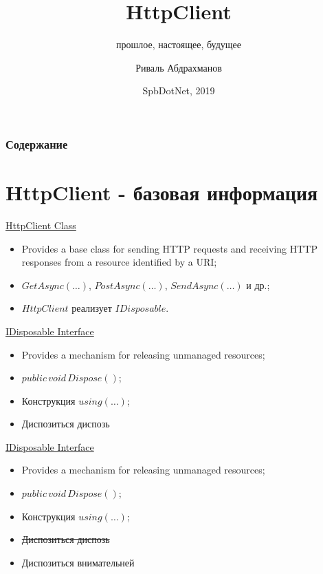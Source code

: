 \documentclass{beamer}
\title{HttpClient}
\subtitle{прошлое, настоящее, будущее}
\author{Риваль Абдрахманов}
\institute[PT]{Positive Technologies}
\date{SpbDotNet, 2019}
\begin{document}
\begin{frame}
\titlepage
\end{frame}

\begin{frame}
\frametitle{Содержание}
\tableofcontents
\end{frame}

\section{HttpClient - базовая информация}

\begin{frame}{\href{https://docs.microsoft.com/en-us/dotnet/api/system.net.http.httpclient?view=netcore-2.2}{HttpClient Class}}
    \begin{itemize}
        \item <1-> Provides a base class for sending HTTP requests and receiving HTTP responses from a resource identified by a URI;
        \item <2-> $GetAsync(\ldots)$, $PostAsync(\ldots)$, $SendAsync(\ldots)$ и др.;
        \item <3-> $HttpClient$ реализует $IDisposable$.
    \end{itemize}
\end{frame}

\begin{frame}{\href{https://docs.microsoft.com/en-us/dotnet/api/system.idisposable?view=netcore-2.2}{IDisposable Interface}}
    \begin{itemize}
        \item <1-> Provides a mechanism for releasing unmanaged resources;
        \item <2-> $public\,void\,Dispose()$;
        \item <3-> Конструкция $using(\ldots)$;
        \item <4-> Диспозиться\,\textrightarrow \,диспозь
    \end{itemize}
\end{frame}

\begin{frame}{\href{https://docs.microsoft.com/en-us/dotnet/api/system.idisposable?view=netcore-2.2}{IDisposable Interface}}
    \begin{itemize}
        \item Provides a mechanism for releasing unmanaged resources;
        \item $public\,void\,Dispose()$;
        \item Конструкция $using(\ldots)$;
        \item \sout{Диспозиться\,\textrightarrow \,диспозь}
        \item Диспозиться\,\textrightarrow \,внимательней
    \end{itemize}
\end{frame}
\end{document}
